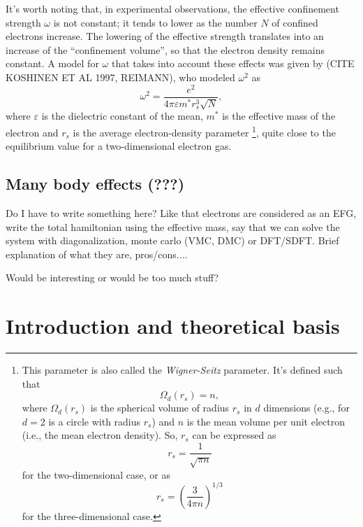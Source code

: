 \documentclass[a4paper,twoside,11pt]{book}
\begin{document}
It's worth noting that, in experimental observations, the effective confinement strength $\omega$ is not constant; it tends to lower as the number $N$ of confined electrons increase. The lowering of the effective strength translates into an increase of the ``confinement volume'', so that the electron density remains constant. A model for $\omega$ that takes into account these effects was given by (CITE KOSHINEN ET AL 1997, REIMANN), who modeled $\omega^2$ as
\begin{equation}
	\omega^2 = \frac{e^2}{4\pi\varepsilon m^*r_s^3\sqrt{N}},
\end{equation}
where $\varepsilon$ is the dielectric constant of the mean, $m^*$ is the effective mass of the electron and $r_s$ is the average electron-density parameter
\footnote{
	This parameter is also called the \emph{Wigner-Seitz} parameter. It's defined such that
	\begin{equation*}
		\Omega_d(r_s) = n,
	\end{equation*}
	where $\Omega_d(r_s)$ is the spherical volume of radius $r_s$ in $d$ dimensions (e.g., for $d=2$ is a circle with radius $r_s$) and $n$ is the mean volume per unit electron (i.e., the mean electron density). So, $r_s$ can be expressed as
	\begin{equation*}
		r_s = \frac{1}{\sqrt{\pi n}}
	\end{equation*}
	for the two-dimensional case, or as
	\begin{equation*}
		r_s = \left(\frac{3}{4\pi n}\right)^{1/3}
	\end{equation*}
	for the three-dimensional case.
},
quite close to the equilibrium value  for a two-dimensional electron gas.

\section{Many body effects (???)}
Do I have to write something here? Like that electrons are considered as an EFG, write the total hamiltonian using the effective mass, say that we can solve the system with diagonalization, monte carlo (VMC, DMC) or DFT/SDFT. Brief explanation of what they are, pros/cons....

Would be interesting or would be too much stuff?


\chapter{Introduction and theoretical basis}
\end{document}
